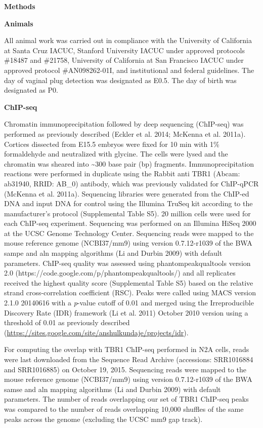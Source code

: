 \documentclass[]{article}
\begin{document}
\textbf{Methods}

\textbf{Animals}

All animal work was carried out in compliance with the University of
California at Santa Cruz IACUC, Stanford University IACUC under approved
protocols \#18487 and \#21758, University of California at San Francisco
IACUC under approved protocol \#AN098262-01I, and institutional and
federal guidelines. The day of vaginal plug detection was designated as
E0.5. The day of birth was designated as P0.

\textbf{ChIP-seq}

Chromatin immunoprecipitation followed by deep sequencing (ChIP-seq) was
performed as previously described (Eckler et al. 2014; McKenna et al.
2011a). Cortices dissected from E15.5 embryos were fixed for 10 min with
1\% formaldehyde and neutralized with glycine. The cells were lysed and
the chromatin was sheared into \textasciitilde{}300 base pair (bp)
fragments. Immunoprecipitation reactions were performed in duplicate
using the Rabbit anti TBR1 (Abcam: ab31940, RRID: AB\_0) antibody, which
was previously validated for ChIP-qPCR (McKenna et al. 2011a).
Sequencing libraries were generated from the ChIP-ed DNA and input DNA
for control using the Illumina TruSeq kit according to the
manufacturer's protocol (Supplemental Table S5). 20 million cells were
used for each ChIP-seq experiment. Sequencing was performed on an
Illumina HiSeq 2000 at the UCSC Genome Technology Center. Sequencing
reads were mapped to the mouse reference genome (NCBI37/mm9) using
version 0.7.12-r1039 of the BWA sampe and aln mapping algorithms (Li and
Durbin 2009) with default parameters. ChIP-seq quality was assessed
using phantompeakqualtools version 2.0
(https://code.google.com/p/phantompeakqualtools/) and all replicates
received the highest quality score (Supplemental Table S5) based on the
relative strand cross-correlation coefficient (RSC). Peaks were called
using MACS version 2.1.0 20140616 with a \emph{p}-value cutoff of 0.01
and merged using the Irreproducible Discovery Rate (IDR) framework (Li
et al. 2011) October 2010 version using a threshold of 0.01 as
previously described
(\url{https://sites.google.com/site/anshulkundaje/projects/idr}).

For computing the overlap with TBR1 ChIP-seq performed in N2A cells,
reads were last downloaded from the Sequence Read Archive (accessions:
SRR1016884 and SRR1016885) on October 19, 2015. Sequencing reads were
mapped to the mouse reference genome (NCBI37/mm9) using version
0.7.12-r1039 of the BWA samse and aln mapping algorithms (Li and Durbin
2009) with default parameters. The number of reads overlapping our set
of TBR1 ChIP-seq peaks was compared to the number of reads overlapping
10,000 shuffles of the same peaks across the genome (excluding the UCSC
mm9 gap track).
\end{document}
